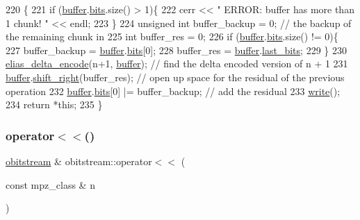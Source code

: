 \begin{DoxyCode}
220                                                          \{
221   \textcolor{keywordflow}{if} (\hyperlink{classobitstream_aeaccad00a395a404aa16472bfa052be3}{buffer}.\hyperlink{classbit__pipe_a86f38af1e9736b053728033490476b50}{bits}.size() > 1)\{
222     cerr << \textcolor{stringliteral}{" ERROR: buffer has more than 1 chunk! "} << endl;
223   \}
224   \textcolor{keywordtype}{unsigned} \textcolor{keywordtype}{int} buffer\_backup = 0; \textcolor{comment}{// the backup of the remaining chunk in }
225   \textcolor{keywordtype}{int} buffer\_res = 0; 
226   \textcolor{keywordflow}{if} (\hyperlink{classobitstream_aeaccad00a395a404aa16472bfa052be3}{buffer}.\hyperlink{classbit__pipe_a86f38af1e9736b053728033490476b50}{bits}.size() != 0)\{
227     buffer\_backup = \hyperlink{classobitstream_aeaccad00a395a404aa16472bfa052be3}{buffer}.\hyperlink{classbit__pipe_a86f38af1e9736b053728033490476b50}{bits}[0];
228     buffer\_res = \hyperlink{classobitstream_aeaccad00a395a404aa16472bfa052be3}{buffer}.\hyperlink{classbit__pipe_a0f3e84b02751803adaab499b5dad86fe}{last\_bits};
229   \}
230   \hyperlink{bitstream_8cpp_a63daa014203b9a5b2622a264cbfdff7b}{elias\_delta\_encode}(n+1, \hyperlink{classobitstream_aeaccad00a395a404aa16472bfa052be3}{buffer}); \textcolor{comment}{// find the delta encoded version of n + 1 }
231   \hyperlink{classobitstream_aeaccad00a395a404aa16472bfa052be3}{buffer}.\hyperlink{classbit__pipe_a341a1f62d728a67f730503ca722a7770}{shift\_right}(buffer\_res); \textcolor{comment}{// open up space for the residual of the previous
       operation}
232   \hyperlink{classobitstream_aeaccad00a395a404aa16472bfa052be3}{buffer}.\hyperlink{classbit__pipe_a86f38af1e9736b053728033490476b50}{bits}[0] |= buffer\_backup; \textcolor{comment}{// add the residual}
233   \hyperlink{classobitstream_a5ac23633932baad040856f0a33ee1ebf}{write}();
234   \textcolor{keywordflow}{return} *\textcolor{keyword}{this};
235 \}
\end{DoxyCode}
\mbox{\label{classobitstream_aed715e98e8b47e19e465da1445372229}} 
\subsubsection{\texorpdfstring{operator$<$$<$()}{operator<<()}\hspace{0.1cm}{\footnotesize\ttfamily [2/2]}}
{\footnotesize\ttfamily \hyperlink{classobitstream}{obitstream} \& obitstream\+::operator$<$$<$ (\begin{DoxyParamCaption}\item[{const mpz\+\_\+class \&}]{n }\end{DoxyParamCaption})}



